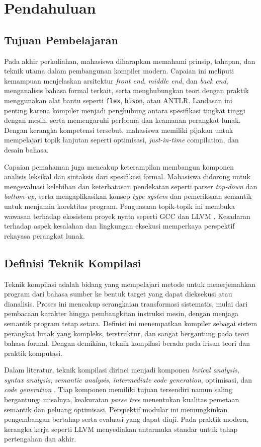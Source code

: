\documentclass[../main.tex]{subfiles}
\begin{document}
\chapter{Pendahuluan}

\section{Tujuan Pembelajaran}
Pada akhir perkuliahan, mahasiswa diharapkan memahami prinsip, tahapan, dan teknik utama dalam pembangunan kompiler modern. Capaian ini meliputi kemampuan menjelaskan arsitektur \emph{front end}, \emph{middle end}, dan \emph{back end}, menganalisis bahasa formal terkait, serta menghubungkan teori dengan praktik menggunakan alat bantu seperti \texttt{flex}, \texttt{bison}, atau ANTLR. Landasan ini penting karena kompiler menjadi penghubung antara spesifikasi tingkat tinggi dengan mesin, serta memengaruhi performa dan keamanan perangkat lunak. Dengan kerangka kompetensi tersebut, mahasiswa memiliki pijakan untuk mempelajari topik lanjutan seperti optimisasi, \emph{just-in-time} compilation, dan desain bahasa.

Capaian pemahaman juga mencakup keterampilan membangun komponen analisis leksikal dan sintaksis dari spesifikasi formal. Mahasiswa didorong untuk mengevaluasi kelebihan dan keterbatasan pendekatan seperti parser \emph{top-down} dan \emph{bottom-up}, serta mengaplikasikan konsep \emph{type system} dan pemeriksaan semantik untuk menjamin korektitas program. Penguasaan topik-topik ini membuka wawasan terhadap ekosistem proyek nyata seperti GCC dan LLVM \citep{GCCInternals,LLVMOverview}. Kesadaran terhadap aspek kesalahan dan lingkungan eksekusi memperkaya perspektif rekayasa perangkat lunak.

\section{Definisi Teknik Kompilasi}
Teknik kompilasi adalah bidang yang mempelajari metode untuk menerjemahkan program dari bahasa sumber ke bentuk target yang dapat dieksekusi atau dianalisis. Proses ini mencakup serangkaian transformasi sistematis, mulai dari pembacaan karakter hingga pembangkitan instruksi mesin, dengan menjaga semantik program tetap setara. Definisi ini menempatkan kompiler sebagai sistem perangkat lunak yang kompleks, terstruktur, dan sangat bergantung pada teori bahasa formal. Dengan demikian, teknik kompilasi berada pada irisan teori dan praktik komputasi.

Dalam literatur, teknik kompilasi dirinci menjadi komponen \emph{lexical analysis}, \emph{syntax analysis}, \emph{semantic analysis}, \emph{intermediate code generation}, optimisasi, dan \emph{code generation} \citep{Mogensen2010,Wirth1996}. Tiap komponen memiliki tujuan tersendiri namun saling bergantung; misalnya, keakuratan \emph{parse tree} menentukan kualitas pemetaan semantik dan peluang optimisasi. Perspektif modular ini memungkinkan pengembangan bertahap serta evaluasi yang dapat diuji. Pada praktik modern, kerangka kerja seperti LLVM menyediakan antarmuka standar untuk tahap pertengahan dan akhir.
\end{document}
